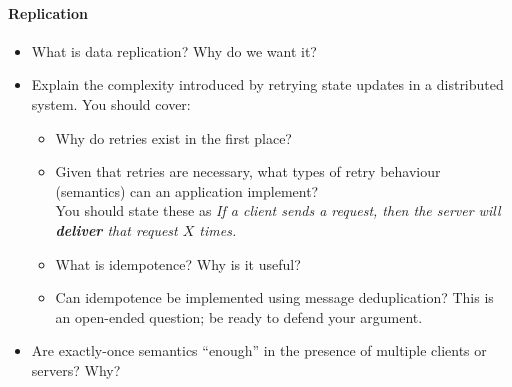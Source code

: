 \documentclass[12pt,a4paper,oneside,openright]{report}
\newcommand{\question}[2]{\paragraph{#1} #2}
\begin{document}
\question{Replication}{
  \begin{itemize}
  \item What is data replication? Why do we want it?
  \item Explain the complexity introduced by retrying state updates in
    a distributed system. You should cover:
    \begin{itemize}
    \item Why do retries exist in the first place?
    \item Given that retries are necessary, what types of retry
      behaviour (semantics) can an application implement?\\
      You should state these as \emph{If a client sends a request,
        then the server will \textbf{deliver} that request $X$ times.}
    \item What is idempotence? Why is it useful?
    \item Can idempotence be implemented using message deduplication?
      This is an open-ended question; be ready to defend your
      argument.
    \end{itemize}
  \item Are exactly-once semantics ``enough'' in the presence of
    multiple clients or servers? Why?
  \end{itemize}
}

\end{document}

